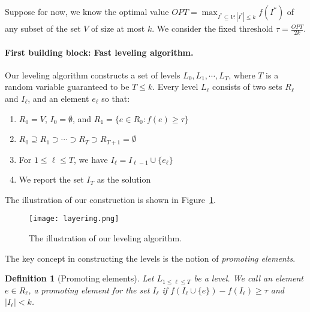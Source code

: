\documentclass[11pt]{article}
\newtheorem{definition}{Definition}[section]
\begin{document}
Suppose for now, we know the optimal value $OPT = \max_{I^* \subseteq V: |I^*| \le k} f(I^*)$ of any subset of the set $V$ 
of size at most $k$. We consider the fixed threshold $\tau = \frac{OPT}{2k}$. 




\paragraph{First building block: Fast leveling algorithm.}
Our leveling algorithm constructs a set of levels $L_0, L_1, \cdots, L_T$, where $T$ is a random variable guaranteed to be $T \le k$. 
Every level $L_{\ell}$ consists of two sets $R_{\ell}$ and $I_{\ell}$, 
and an element $e_{\ell}$ so that:  
\begin{enumerate}
    \item $R_0 = V$, $I_0=\emptyset$, and $R_1 = \{e \in R_0: f(e) \ge \tau\}$
    \item $R_0 \supseteq R_1 \supset \cdots \supset R_T \supset R_{T+1}=\emptyset$ 
    
    \item For $1 \le \ell \le T$, we have $I_{\ell} = I_{\ell-1} \cup \{e_{\ell}\}$ 
    \item We report the set $I_T$ as the solution
\end{enumerate}

The illustration of our construction is shown in Figure~\ref{fig:layering}. 

\begin{figure}[h]
\begin{center}
\texttt{[image: layering.png]}
\end{center}
\vspace{-0.3cm}
\caption{The illustration of our leveling algorithm. }
\label{fig:layering}
\end{figure}



The key concept in constructing the levels is the notion of \emph{promoting elements}. 

\begin{tcolorbox}[width=\linewidth, colback=white!80!gray,boxrule=0pt,frame hidden, sharp corners]

\begin{definition}[Promoting elements]
\label{def:cardinality:promote}
Let $L_{1 \le \ell \le T}$ be a level. 
We call an element $e \in R_{\ell}$, a promoting element for the set $I_{\ell}$ if 
$f(I_{\ell} \cup \{e\}) - f(I_{\ell}) \ge \tau$ and $|I_{\ell}| < k$.
\end{definition}

\end{tcolorbox}
\end{document}
